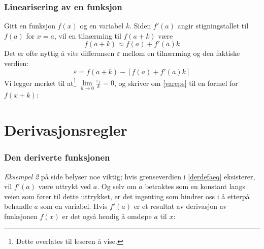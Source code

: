 \subsubsection{Linearisering av en funksjon}
Gitt en funksjon $ f(x) $ og en variabel $ k $. Siden $ f'(a) $ angir stigningstallet til $ f(a) $ for $ x=a $, vil en tilnærming til $ f(a+k) $ være
\[ f(a+k)\approx f(a)+f'(a)k \]
Det er ofte nyttig å vite differansen $ \varepsilon $ mellom en tilnærming og den faktiske verdien:
\begin{equation}\label{vareps}
	\varepsilon = f(a+k)-\left[f(a)+f'(a)k\right]
\end{equation}
Vi legger merket til at\footnote{Dette overlates til leseren å vise.} $ \lim\limits_{h\to0}\frac{\varepsilon_f}{k} =0 $, og skriver om \eqref{vareps} til en formel for $ f(x+k) $: \regv
{}

\section{Derivasjonsregler}
\subsubsection{Den deriverte funksjonen}
\textsl{Eksempel 2} på side \pageref{dereks2} belyser noe viktig; hvis grenseverdien i \eqref{derdefaeq} eksisterer, vil $ f'(a) $ være uttrykt ved $ a $. Og selv om $ a $ betraktes som en konstant langs veien som fører til dette uttrykket, er det ingenting som hindrer oss i å etterpå behandle $ a $ som en variabel. Hvis $ f'(a) $ er et resultat av derivasjon av funksjonen $ f(x) $ er det også hendig å omdøpe $ a $ til $ x $:\regv
{}
 \regv

